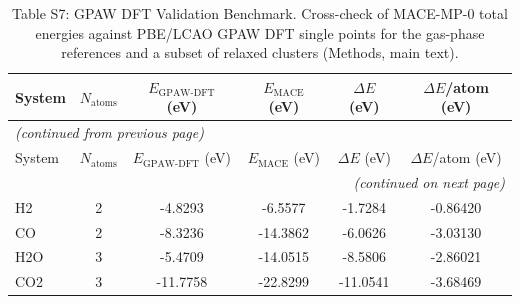 {\scriptsize
\begin{longtable}{lccccc}
\caption{Table S7: GPAW DFT Validation Benchmark. Cross-check of MACE-MP-0 total energies against PBE/LCAO GPAW DFT single points for the gas-phase references and a subset of relaxed clusters (Methods, main text).} \label{tab:gpaw_validation} \\
\hline\hline
System & $N_{\mathrm{atoms}}$ & $E_{\mathrm{GPAW\text{-}DFT}}$ (eV) & $E_{\mathrm{MACE}}$ (eV) & $\Delta E$ (eV) & $\Delta E$/atom (eV) \\
\hline
\endfirsthead
\multicolumn{6}{l}{\textit{(continued from previous page)}} \\
\hline\hline
System & $N_{\mathrm{atoms}}$ & $E_{\mathrm{GPAW\text{-}DFT}}$ (eV) & $E_{\mathrm{MACE}}$ (eV) & $\Delta E$ (eV) & $\Delta E$/atom (eV) \\
\hline
\endhead
\hline
\multicolumn{6}{r}{\textit{(continued on next page)}} \\
\endfoot
\hline\hline
\endlastfoot
H2 & 2 & -4.8293 & -6.5577 & -1.7284 & -0.86420 \\
CO & 2 & -8.3236 & -14.3862 & -6.0626 & -3.03130 \\
H2O & 3 & -5.4709 & -14.0515 & -8.5806 & -2.86021 \\
CO2 & 3 & -11.7758 & -22.8299 & -11.0541 & -3.68469 \\
\end{longtable}
}
